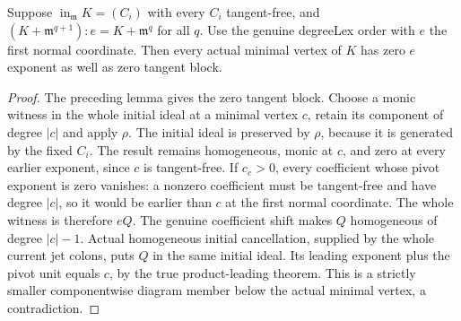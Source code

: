 \begin{lemma}
\label{hir:actual-first-normal-pivot-minimal-vertices}
\leanok
Suppose $\operatorname{in}_{\mathfrak m}K=(C_i)$ with every $C_i$
tangent-free, and
$(K+\mathfrak m^{q+1}):e=K+\mathfrak m^q$ for all $q$.
Use the genuine degreeLex order with $e$ the first normal coordinate.
Then every actual minimal vertex of $K$ has zero $e$ exponent as well as
zero tangent block.
\end{lemma}
\begin{proof}
The preceding lemma gives the zero tangent block. Choose a monic witness
in the whole initial ideal at a minimal vertex $c$, retain its component
of degree $|c|$ and apply $\rho$. The initial ideal is preserved by $\rho$,
because it is generated by the fixed $C_i$. The result remains homogeneous,
monic at $c$, and zero at every earlier exponent, since $c$ is tangent-free.
If $c_e>0$, every coefficient whose pivot exponent is zero vanishes: a
nonzero coefficient must be tangent-free and have degree $|c|$, so it
would be earlier than $c$ at the first normal coordinate. The whole witness
is therefore $eQ$. The genuine coefficient shift makes $Q$ homogeneous of
degree $|c|-1$. Actual homogeneous initial cancellation, supplied by the
whole current jet colons, puts $Q$ in the same initial ideal. Its leading
exponent plus the pivot unit equals $c$, by the true product-leading theorem.
This is a strictly smaller componentwise diagram member below the actual
minimal vertex, a contradiction.
\end{proof}


